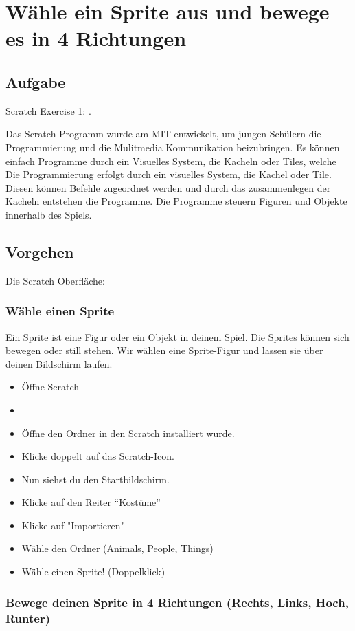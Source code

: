 \section{Wähle ein Sprite aus und bewege es in 4 Richtungen}
\subsection{Aufgabe}
Scratch Exercise 1: .

Das Scratch Programm wurde am MIT entwickelt, um jungen Schülern die Programmierung und die Mulitmedia Kommunikation beizubringen. 
Es können einfach Programme durch ein Visuelles System, die Kacheln oder Tiles, welche 
Die Programmierung erfolgt durch ein visuelles System, die Kachel oder Tile. Diesen können Befehle zugeordnet werden und durch das zusammenlegen der Kacheln entstehen die Programme. Die Programme steuern Figuren und Objekte innerhalb des Spiels.


\subsection{Vorgehen}
Die Scratch Oberfläche:


\subsubsection{Wähle einen Sprite}

Ein Sprite ist eine Figur oder ein Objekt in deinem Spiel. Die Sprites können sich bewegen oder still stehen. Wir wählen eine Sprite-Figur und lassen sie über deinen Bildschirm laufen.
\begin{itemize}
\item Öffne Scratch
\item 
\item Öffne den Ordner in den Scratch installiert wurde.
\item Klicke doppelt auf das Scratch-Icon.

\item Nun siehst du den Startbildschirm. 
\item Klicke auf den Reiter “Kostüme”
\item Klicke auf  "Importieren"
\item Wähle den Ordner (Animals, People, Things)
\item Wähle einen  Sprite! (Doppelklick)
\end{itemize}

\subsubsection{Bewege deinen Sprite in 4 Richtungen (Rechts, Links, Hoch, Runter)}

